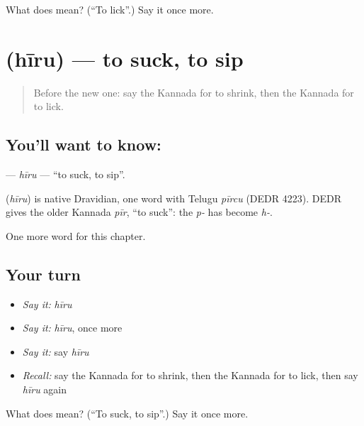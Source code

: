 \begin{tcolorbox}[breakable,colback=teal!4,colframe=teal!35!black,title={Before you move on}]
What does  mean? (\textquotedblleft{}To lick\textquotedblright{}.) Say it once more.
\end{tcolorbox}
\section[\texorpdfstring{\kn{ಹೀರು} (hīru)}{ಹೀರು (hīru)}]{ (hīru) — to suck, to sip}

\label{lesson:KA-C244-hiru}



\begin{quote}
Before the new one: say the Kannada for to shrink, then the Kannada for to lick.
\end{quote}

\subsection*{You'll want to know: }
\textbf{} — \emph{hīru} — \textquotedblleft{}to suck, to sip\textquotedblright{}.

\begin{cousinweb}
\textbf{} (\emph{hīru}) is native Dravidian, one word with Telugu \emph{pīrcu} (DEDR 4223). DEDR gives the older Kannada \emph{pīr}, \textquotedblleft{}to suck\textquotedblright{}: the \emph{p-} has become \emph{h-}.
\end{cousinweb}

\begin{grammarlens}[title={What you've built}]
One more word for this chapter.
\end{grammarlens}

\subsection*{Your turn}
\begin{itemize}
\raggedright
  \item \emph{Say it:} \emph{hīru}
  \item \emph{Say it:} \emph{hīru}, once more
  \item \emph{Say it:} say \emph{hīru}
  \item \emph{Recall:} say the Kannada for to shrink, then the Kannada for to lick, then say \emph{hīru} again
\end{itemize}

\begin{tcolorbox}[breakable,colback=teal!4,colframe=teal!35!black,title={Before you move on}]
What does  mean? (\textquotedblleft{}To suck, to sip\textquotedblright{}.) Say it once more.
\end{tcolorbox}
